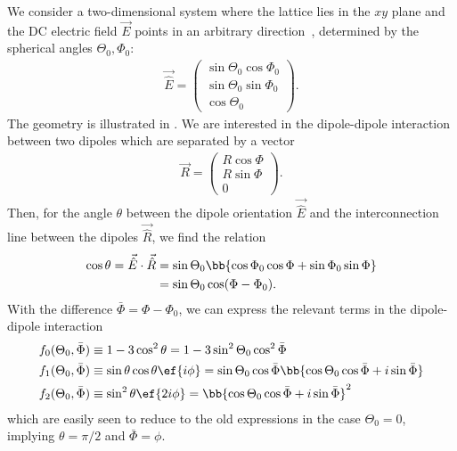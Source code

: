 \noindent
We consider a two-dimensional system where the lattice lies in the $xy$ plane and the DC electric field $\vec{E}$ points in an arbitrary direction~\cite{Gorshkov2011c}, determined by the spherical angles $\Theta_0, \Phi_0$:
\begin{align}
    \vec{\hat{E}}=\begin{pmatrix}
        \sin\Theta_0\cos\Phi_0 \\
        \sin\Theta_0\sin\Phi_0 \\
        \cos\Theta_0
    \end{pmatrix}.
\end{align}
The geometry is illustrated in .
We are interested in the dipole-dipole interaction between two dipoles which are separated
by a vector
\begin{align}
    \vec{R}=\begin{pmatrix}R\cos\Phi \\ R\sin\Phi \\ 0\end{pmatrix}.
\end{align}
Then, for the angle $\theta$ between the dipole orientation $\vec{\hat{E}}$ and the interconnection line between the dipoles $\vec{\hat{R}}$, we find the relation
\begin{align}
    \cos\theta = \vec{\hat{E}} \cdot \vec{\hat{R}} &= \sin\Theta_0\bb{\cos\Phi_0\cos\Phi+\sin\Phi_0\sin\Phi}\\
&=\sin\Theta_0\cos(\Phi-\Phi_0).
\end{align}
With the difference $\bar\Phi=\Phi-\Phi_0$, we can express the relevant terms in the dipole-dipole interaction
\begin{align}
    f_0(\Theta_0, \bar \Phi)&\equiv 1-3\cos^2\theta = 1-3\sin^2\Theta_0\cos^2\bar\Phi  \\
    f_1(\Theta_0, \bar \Phi)&\equiv \sin\theta\cos\theta \ef{i\phi} = \sin\Theta_0 \cos\bar\Phi \bb{\cos\Theta_0 \cos\bar\Phi + i \sin \bar\Phi}\\
    f_2(\Theta_0, \bar \Phi)&\equiv\sin^2\theta \ef{2i\phi} = \bb{\cos\Theta_0 \cos\bar\Phi + i \sin \bar\Phi}^2
\end{align}
which are easily seen to reduce to the old expressions in the case $\Theta_0=0$,
implying $\theta=\pi/2$ and $\bar\Phi=\phi$.

